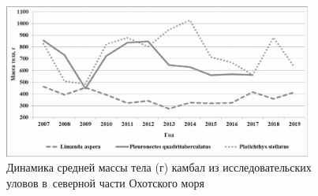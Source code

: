 \begin{figure}[h!]
  \begin{center}
    \includegraphics[width=0.9\textwidth]{authors/Byrlak-fig2.png}
  \end{center}
  \caption{Динамика средней массы тела (г) камбал из исследовательских уловов в~северной части Охотского моря}
  \label{fig:byrlak-fig2}
\end{figure}
